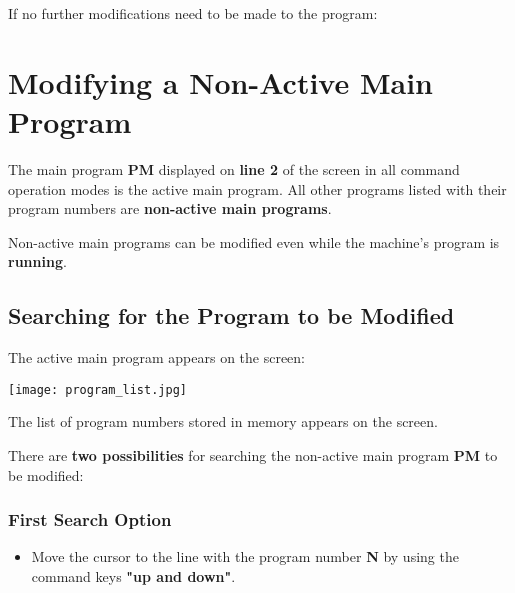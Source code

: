 If no further modifications need to be made to the program:

\begin{itemize}
\end{itemize}

\newpage

\section{Modifying a Non-Active Main Program}

The main program \textbf{PM} displayed on \textbf{line 2} of the screen in all command operation modes is the active main program.  
All other programs listed with their program numbers are \textbf{non-active main programs}.

Non-active main programs can be modified even while the machine's program is \textbf{running}.

\subsection{Searching for the Program to be Modified}

\begin{itemize}
\end{itemize}

The active main program appears on the screen:

\begin{itemize}
\end{itemize}

\begin{center}
    \texttt{[image: program\_list.jpg]}
\end{center}

The list of program numbers stored in memory appears on the screen.

There are \textbf{two possibilities} for searching the non-active main program \textbf{PM} to be modified:

\subsubsection*{First Search Option}

\begin{itemize}
    \item Move the cursor to the line with the program number \textbf{N} by using the command keys \textbf{"up and down"}.
\end{itemize}

